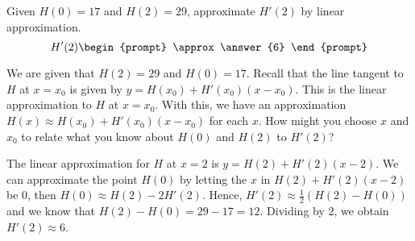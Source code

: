 \documentclass{ximera}
\author{Gregory Hartman \and Matthew Carr}
\begin{document}
\begin{exercise}





Given $H(0)=17$ and $H(2)=29$, approximate $H'(2)$ by linear approximation.
\[
H'(2)
\begin{prompt}
\approx \answer{6}
\end{prompt}
\]

\begin{hint}
We are given that $H(2)=29$ and $H(0)=17$. Recall that the line tangent to $H$ at $x=x_0$ is given by $y=H(x_0)+H'(x_0)(x-x_0)$. This is the linear approximation to $H$ at $x=x_0$. With this, we have an approximation $H(x)\approx H(x_0)+H'(x_0)(x-x_0)$ for each $x$. How might you choose $x$ and $x_0$ to relate what you know about $H(0)$ and $H(2)$ to $H'(2)$?
\end{hint}
\begin{hint}
The linear approximation for $H$ at $x=2$ is $y=H(2)+H'(2)(x-2)$. We can approximate the point $H(0)$ by letting the $x$ in $H(2)+H'(2)(x-2)$ be $0$, then $H(0)\approx H(2)-2H'(2)$. Hence, $H'(2)\approx\frac{1}{2}\left(H(2)-H(0)\right)$ and we know that $H(2)-H(0)=29-17=12$. Dividing by $2$, we obtain $H'(2)\approx6$.
\end{hint}
\end{exercise}
\end{document}
